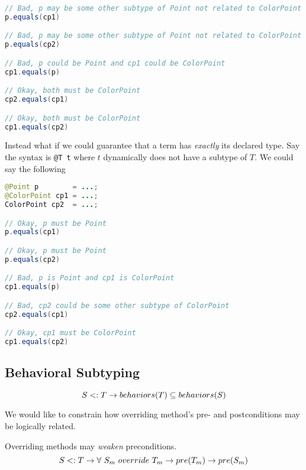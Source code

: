 \documentclass{article}
\begin{document}
\begin{example}
\begin{lstlisting}[language=Java, escapechar=|]
// Bad, p may be some other subtype of Point not related to ColorPoint
p.equals(cp1)

// Bad, p may be some other subtype of Point not related to ColorPoint
p.equals(cp2)

// Bad, p could be Point and cp1 could be ColorPoint
cp1.equals(p)

// Okay, both must be ColorPoint
cp2.equals(cp1)

// Okay, both must be ColorPoint
cp1.equals(cp2) 
\end{lstlisting}
  Instead what if we could guarantee that a term has \textit{exactly} its declared type.
  Say the syntax is \texttt{@T t} where $t$ dynamically does not have a subtype of $T$.
  We could say the following
\begin{lstlisting}[language=Java, escapechar=|]
@Point p        = ...;
@ColorPoint cp1 = ...;
ColorPoint cp2  = ...;

// Okay, p must be Point
p.equals(cp1)

// Okay, p must be Point
p.equals(cp2)

// Bad, p is Point and cp1 is ColorPoint
cp1.equals(p)

// Bad, cp2 could be some other subtype of ColorPoint
cp2.equals(cp1)

// Okay, cp1 must be ColorPoint
cp1.equals(cp2) 
\end{lstlisting}
\end{example}

\subsection{Behavioral Subtyping}

\begin{definition}
\begin{equation}
    S <: T \rightarrow behaviors(T) \subseteq behaviors(S)
\end{equation} 
\end{definition}

We would like to constrain how overriding method's pre- and postconditions may be logically related.

\begin{definition}
Overriding methods may \textit{weaken} preconditions.
\begin{equation}
S <: T \rightarrow \forall ~ S_m ~ override{} ~ T_m \rightarrow pre(T_m) \rightarrow pre(S_m)
\end{equation}
\end{definition}
\end{document}
